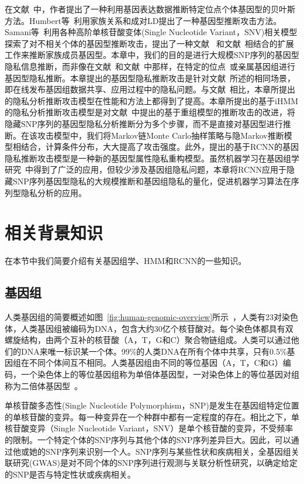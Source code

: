 在文献~\cite{schadt2012bayesian}中，作者提出了一种利用基因表达数据推断特定位点个体基因型的贝叶斯方法。Humbert等~\cite{humbert2013addressing}利用家族关系和成对LD提出了一种基因型推断攻击方法。Samani等~\cite{samani2015quantifying}利用各种高阶单核苷酸变体(Single Nucleotide Variant，SNV)相关模型探索了对不相关个体的基因型推断攻击，提出了一种文献~\cite{humbert2013addressing} 和文献~\cite{deznabi2018inference}相结合的扩展工作来推断家族成员基因型。本章中，我们的目的是进行大规模SNP序列的基因型隐私信息推断，而非像在文献~\cite{humbert2013addressing}和文献~\cite{deznabi2018inference}中那样，在特定的位点~\cite{schadt2012bayesian}或亲属基因组进行基因型隐私推断。本章提出的基因型隐私推断攻击是针对文献~\cite{samani2015quantifying}所述的相同场景，即在线发布基因组数据共享、应用过程中的隐私问题。与文献~\cite{samani2015quantifying}相比，本章所提出的隐私分析推断攻击模型在性能和方法上都得到了提高。本章所提出的基于iHMM的隐私分析推断攻击模型是对文献~\cite{samani2015quantifying}中提出的基于重组模型的推断攻击的改进，将隐藏SNP序列的基因型隐私分析推断分为多个步骤，而不是直接对基因型进行推断。在该攻击模型中，我们将Markov链Monte Carlo抽样策略与隐Markov推断模型相结合，计算条件分布，大大提高了攻击强度。此外，提出的基于RCNN的基因隐私推断攻击模型是一种新的基因型属性隐私重构模型。虽然机器学习在基因组学研究~\cite{libbrecht2015machine}中得到了广泛的应用，但较少涉及基因组隐私问题，本章将RCNN应用于隐藏SNP序列基因型隐私的大规模推断和基因组隐私的量化，促进机器学习算法在序列型隐私分析的应用。


\section{相关背景知识}\label{sec:back}

在本节中我们简要介绍有关基因组学、HMM和RCNN的一些知识。

\subsection{基因组}
人类基因组的简要概述如图~\ref{fig:human-genomic-overview}所示~\cite{samani2015quantifying}，人类有23对染色体，人类基因组被编码为DNA，包含大约30亿个核苷酸对。每个染色体都具有双螺旋结构，由两个互补的核苷酸（A，T，G和C）聚合物链组成。人类可以通过他们的DNA来唯一标识某一个体。99\%的人类DNA在所有个体中共享，只有0.5\%基因组在不同个体间互不相同。人类基因组由不同的等位基因（A，T，C和G）编码，一个染色体上的等位基因组称为单倍体基因型，一对染色体上的等位基因对组称为二倍体基因型~\cite{durbin1998biological}。

单核苷酸多态性(Single Nucleotide Polymorphism，SNP)是发生在基因组特定位置的单核苷酸的变异。每一种变异在一个种群中都有一定程度的存在。相比之下，单核苷酸变异（Single Nucleotide Variant，SNV）是单个核苷酸的变异，不受频率的限制。一个特定个体的SNP序列与其他个体的SNP序列差异巨大。因此，可以通过他或她的SNP序列来识别一个人。SNP序列与某些性状和疾病相关，全基因组关联研究(GWAS)是对不同个体的SNP序列进行观测与关联分析性研究，以确定给定的SNP是否与特定性状或疾病相关。


